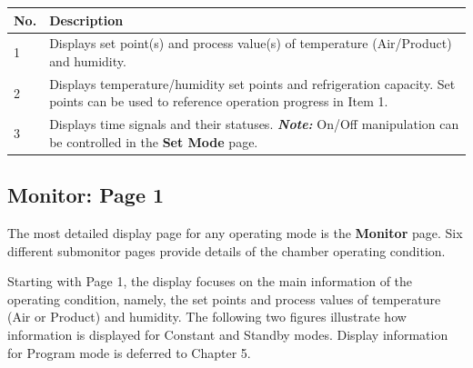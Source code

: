\begin{longtable}[]{@{}|l|l|@{}}
\toprule
\rowcolor{brown}\begin{minipage}[b]{0.07\columnwidth}\raggedright
{\bf{No.}}\strut
\end{minipage} & \begin{minipage}[b]{0.88\columnwidth}\raggedright
{\bf{Description}}\strut
\end{minipage}\tabularnewline
\midrule
\endhead
\begin{minipage}[t]{0.07\columnwidth}\raggedright
1\strut
\end{minipage} & \begin{minipage}[t]{0.88\columnwidth}\raggedright
Displays set point(s) and process value(s) of temperature (Air/Product)
and humidity.\strut
\end{minipage}\tabularnewline
\begin{minipage}[t]{0.07\columnwidth}\raggedright
2\strut
\end{minipage} & \begin{minipage}[t]{0.88\columnwidth}\raggedright
Displays temperature/humidity set points and refrigeration capacity. Set
points can be used to reference operation progress in Item 1.\strut
\end{minipage}\tabularnewline
\begin{minipage}[t]{0.07\columnwidth}\raggedright
3\strut
\end{minipage} & \begin{minipage}[t]{0.88\columnwidth}\raggedright
Displays time signals and their statuses. \textbf{\emph{Note:}} On/Off
manipulation can be controlled in the \textbf{Set Mode} page.\strut
\end{minipage}\tabularnewline
\bottomrule
\end{longtable}


\subsection{Monitor: Page 1}

The most detailed display page for any operating mode is the
\textbf{Monitor} page. Six different submonitor pages provide details of
the chamber operating condition.

Starting with Page 1, the display focuses on the main information of the
operating condition, namely, the set points and process values of
temperature (Air or Product) and humidity. The following two figures
illustrate how information is displayed for Constant and Standby modes.
Display information for Program mode is deferred to Chapter 5.

